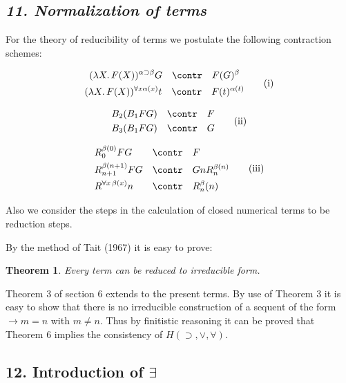 \documentclass[12pt]{article}
\makeatletter
\newcommand{\leqnos}{\tagsleft@true\let\veqno\@@leqno}
\def\imp{\rightarrow}
\def\l{\lambda}
\def\limp{\supset}
\def\a{\alpha}
\def\b{\beta}
\def\HIMP{H(\limp, \lor, \forall)}
\newtheorem{theorem}{Theorem}
\makeatother
\begin{document}
\subsection{\it 11. Normalization of terms}

\leqnos

For the theory of reducibility of terms we postulate the following contraction
schemes:

\begin{equation}
\begin{gathered}
(\l X. \, F(X))^{\a \limp \b} G \quad \contr \quad F(G)^\b \\
(\l X. \, F(X))^{\forall x \a(x)} t \quad \contr\quad  F(t)^{\a(t)}
\end{gathered}
\tag{i}
\end{equation}

\begin{equation}
\begin{aligned}
B_2 (B_1 FG) & \quad \contr \quad F\\
B_3 (B_1 FG) & \quad \contr\quad  G\\
\end{aligned}
\tag{ii}
\end{equation}

\begin{equation}
\begin{aligned}
&R_0^{\b(0)} FG & \contr & \quad F\\
&R_{n+1}^{\b(n+1)} FG & \contr & \quad GnR_n^{\b(n)}\\
&R^{\forall x \, \b(x)} n & \contr & \quad R_n^\b(n)
\end{aligned}
\tag{iii}
\end{equation}

Also we consider the steps in the calculation of closed numerical terms to be
reduction steps. 

By the method of Tait (1967) it is easy to prove:

\begin{theorem}
Every term can be reduced to irreducible form.
\end{theorem}

Theorem 3 of section 6 extends to the present terms. By use of Theorem 3 it is easy to show that there is no irreducible construction of a sequent of the form $\imp m = n$ with $m \neq n$. Thus by finitistic reasoning it can be proved that Theorem 6 implies the consistency of $\HIMP$.

\subsection{12. Introduction of $\exists$}
\end{document}

